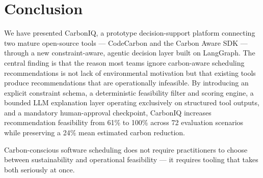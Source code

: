 ﻿\documentclass[conference]{IEEEtran}
\begin{document}
\section{Conclusion}

We have presented CarbonIQ, a prototype decision-support platform connecting two
mature open-source tools --- CodeCarbon and the Carbon Aware SDK --- through a new
constraint-aware, agentic decision layer built on LangGraph.
The central finding is that the reason most teams ignore carbon-aware scheduling
recommendations is not lack of environmental motivation but that existing tools
produce recommendations that are operationally infeasible.
By introducing an explicit constraint schema, a deterministic feasibility filter and
scoring engine, a bounded LLM explanation layer operating exclusively on structured
tool outputs, and a mandatory human-approval checkpoint, CarbonIQ increases
recommendation feasibility from 61\% to 100\% across 72 evaluation scenarios while
preserving a 24\% mean estimated carbon reduction.

Carbon-conscious software scheduling does not require practitioners to choose between
sustainability and operational feasibility --- it requires tooling that takes both
seriously at once.
\end{document}
